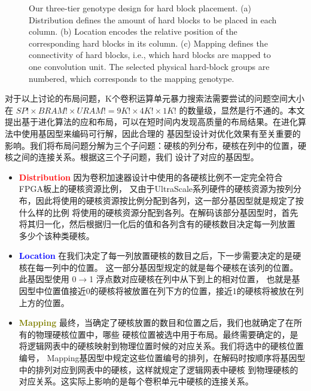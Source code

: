 \begin{figure}[t]
	\caption{Our three-tier genotype design for hard block placement. 
	(a) Distribution defines the amount of hard blocks to be placed in each column. 
	(b) Location encodes the relative position of the corresponding hard blocks in its column. 
	(c) Mapping defines the connectivity of hard blocks, i.e., which hard blocks are mapped to one convolution unit. 
	The selected physical hard-block groups are numbered, which corresponds to the mapping genotype.
	}
	
	

	\label{fig:genotype}
  \vspace{-0.2in}
\end{figure}

对于以上讨论的布局问题，K个卷积运算单元暴力搜索法需要尝试的问题空间大小在 $SP! \times BRAM! \times URAM! = 9K!\times4K!\times1K!$
的数量级，显然是行不通的。本文提出基于进化算法的应和布局，可以在短时间内发现高质量的布局结果。在进化算法中使用基因型来编码可行解，因此合理的
基因型设计对优化效果有至关重要的影响。我们将布局问题分解为三个子问题：硬核的列分布，硬核在列中的位置，硬核之间的连接关系。根据这三个子问题，我们
设计了对应的基因型。

\begin{itemize}
	\item \textcolor{red}{\bf Distribution} 因为卷积加速器设计中使用的各硬核比例不一定完全符合FPGA板上的硬核资源比例，
		又由于UltraScale系列硬件的硬核资源为按列分布，因此将使用的硬核资源按比例分配到各列，这一部分基因型就是规定了按什么样的比例
		将使用的硬核资源分配到各列。在解码该部分基因型时，首先将其归一化，然后根据归一化后的值和各列含有的硬核数目决定每一列放置
		多少个该种类硬核。
	\item \textcolor{blue}{\bf Location} 在我们决定了每一列放置硬核的数目之后，下一步需要决定的是硬核在每一列中的位置。
		这一部分基因型规定的就是每个硬核在该列的位置。此基因型使用 0$\rightarrow$1 浮点数对应硬核在列中从下到上的相对位置，
		也就是基因型中位置值接近0的硬核将被放置在列下方的位置，接近1的硬核将被放在列上方的位置。
	\item \textcolor{olive}{\bf Mapping} 最终，当确定了硬核放置的数目和位置之后，我们也就确定了在所有的物理硬核位置中，哪些
		硬核位置被选中用于布局。最终需要确定的，是将逻辑网表中的硬核映射到物理位置时候的对应关系。我们将选中的硬核位置编号，
		Mapping基因型中规定这些位置编号的排列，在解码时按顺序将基因型中的排列对应到网表中的硬核，这样就规定了逻辑网表中硬核
		到物理硬核的对应关系。这实际上影响的是每个卷积单元中硬核的连接关系。
\end{itemize}

